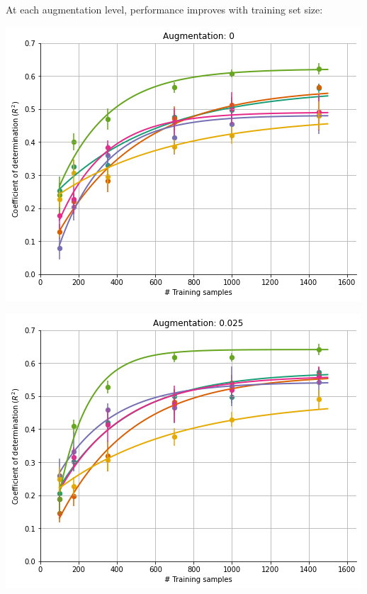 \documentclass[a0paper,landscape,fontscale=0.365]{baposter}
\newenvironment{Figure}
  {\par\medskip\noindent\minipage{\linewidth}}
  {\endminipage\par\medskip}
\begin{document}
\begin{poster}
{At each augmentation level, performance improves with training set size:

\begin{multicols}{4}
    \begin{Figure}
        \centering
        \includegraphics[width=1.0\linewidth]{figures/curves_aug_0}
    \end{Figure}
    \columnbreak

    \begin{Figure}
        \centering
        \includegraphics[width=1.0\linewidth]{figures/curves_aug_40}
    \end{Figure}
    \columnbreak


\end{multicols}}
\end{poster}
\end{document}

